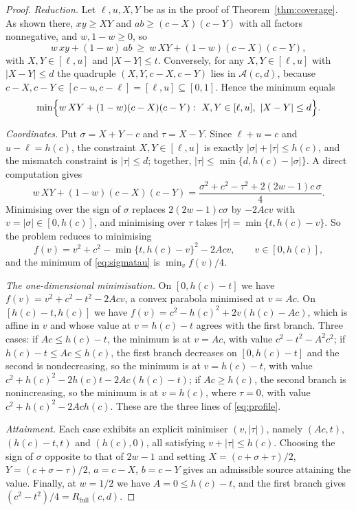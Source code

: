 \documentclass[11pt]{article}
\theoremstyle{definition}
\theoremstyle{remark}
\newcommand{\Rfull}{R_{\mathrm{full}}}
\newcommand{\hc}{h(c)}
\begin{document}
\begin{proof}
\emph{Reduction.} Let $\ell,u,X,Y$ be as in the proof of
Theorem~\ref{thm:coverage}. As shown there, $xy\ge XY$ and $ab\ge(c-X)(c-Y)$
with all factors nonnegative, and $w,1-w\ge0$, so
\[
w\,xy+(1-w)\,ab\ \ge\ w\,XY+(1-w)(c-X)(c-Y),
\]
with $X,Y\in[\ell,u]$ and $|X-Y|\le t$. Conversely, for any $X,Y\in[\ell,u]$
with $|X-Y|\le d$ the quadruple $(X,Y,c-X,c-Y)$ lies in $\mathcal A(c,d)$,
because $c-X,c-Y\in[c-u,c-\ell]=[\ell,u]\subseteq[0,1]$. Hence the minimum
equals
\[
\min\Bigl\{w\,XY+(1-w)(c-X)(c-Y):\ X,Y\in[\ell,u],\ |X-Y|\le d\Bigr\}.
\]

\emph{Coordinates.} Put $\sigma=X+Y-c$ and $\tau=X-Y$. Since $\ell+u=c$ and
$u-\ell=\hc$, the constraint $X,Y\in[\ell,u]$ is exactly
$|\sigma|+|\tau|\le \hc$, and the mismatch constraint is $|\tau|\le d$; together,
$|\tau|\le\min\{d,\hc-|\sigma|\}$. A direct computation gives
\begin{equation}\label{eq:sigmatau}
w\,XY+(1-w)(c-X)(c-Y)
=\frac{\sigma^2+c^2-\tau^2+2(2w-1)c\,\sigma}{4}.
\end{equation}
Minimising over the sign of $\sigma$ replaces $2(2w-1)c\sigma$ by $-2Acv$ with
$v=|\sigma|\in[0,\hc]$, and minimising over $\tau$ takes
$|\tau|=\min\{t,\hc-v\}$. So the problem reduces to minimising
\[
f(v)=v^2+c^2-\min\{t,\hc-v\}^2-2Acv,\qquad v\in[0,\hc],
\]
and the minimum of \eqref{eq:sigmatau} is $\min_v f(v)/4$.

\emph{The one-dimensional minimisation.} On $[0,\hc-t]$ we have
$f(v)=v^2+c^2-t^2-2Acv$, a convex parabola minimised at $v=Ac$. On $[\hc-t,\hc]$
we have $f(v)=c^2-\hc^2+2v(\hc-Ac)$, which is affine in $v$ and whose value at
$v=\hc-t$ agrees with the first branch. Three cases:
if $Ac\le \hc-t$, the minimum is at $v=Ac$, with value $c^2-t^2-A^2c^2$;
if $\hc-t\le Ac\le \hc$, the first branch decreases on $[0,\hc-t]$ and the
second is nondecreasing, so the minimum is at $v=\hc-t$, with value
$c^2+\hc^2-2\hc t-2Ac(\hc-t)$;
if $Ac\ge \hc$, the second branch is nonincreasing, so the minimum is at
$v=\hc$, where $\tau=0$, with value $c^2+\hc^2-2Ac\hc$.
These are the three lines of \eqref{eq:profile}.

\emph{Attainment.} Each case exhibits an explicit minimiser $(v,|\tau|)$, namely
$(Ac,t)$, $(\hc-t,t)$ and $(\hc,0)$, all satisfying $v+|\tau|\le \hc$. Choosing
the sign of $\sigma$ opposite to that of $2w-1$ and setting
$X=(c+\sigma+\tau)/2$, $Y=(c+\sigma-\tau)/2$, $a=c-X$, $b=c-Y$ gives an
admissible source attaining the value. Finally, at $w=1/2$ we have $A=0\le
\hc-t$, and the first branch gives $(c^2-t^2)/4=\Rfull(c,d)$.
\end{proof}
\end{document}
